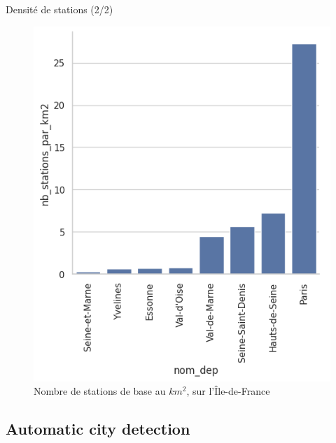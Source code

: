\begin{frame}{Densité de stations (2/2)}
    \begin{figure}
        \includegraphics[height=0.55\paperheight]{images/barplots/densite_station_par_dep_IDF.png}
        \caption{\label{fig:densite_stat_IDF}Nombre de stations de base au $\unit{km^2}$, sur l'Île-de-France}
    \end{figure}
\end{frame}


\subsection{Automatic city detection}
\insertsubsectionframe

